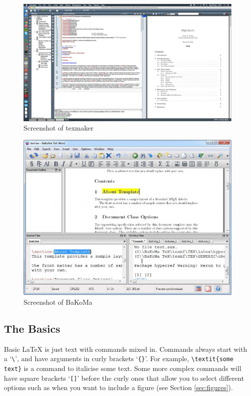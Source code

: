 \documentclass[11pt,a4paper,oneside]{article}
\begin{document}
\begin{landscape}
\begin{figure}
\centering
\includegraphics[scale=0.4]{TeXMaker_screenshot}
\caption{Screenshot of texmaker}
\end{figure}

\begin{figure}
\centering
\includegraphics[scale=0.7]{BaKoMa_screenshot.jpg}
\caption{Screenshot of BaKoMa}
\end{figure}
\end{landscape}

\subsection{The Basics}
Basic \LaTeX{} is just text with commands mixed in.  Commands always start with a `\verb!\!', and have arguments in curly brackets `\verb!{}!'. For example, \verb!\textit{some text}! is a command to italicise some text. Some more complex commands will have square brackets `\verb![]!' before the curly ones that allow you to select different options such as when you want to include a figure (see Section \ref{sec:figures}).
\end{document}
